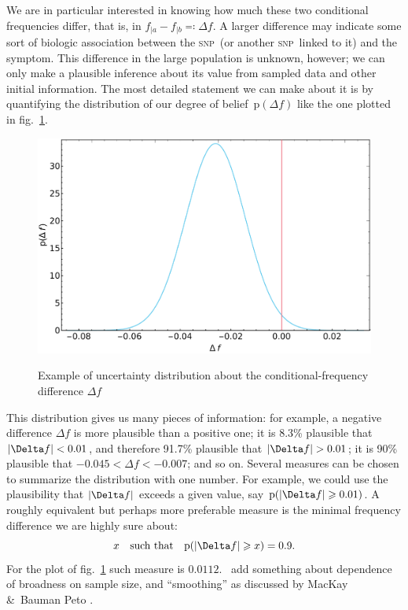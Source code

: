\documentclass[\ifafour a4paper,12pt,\else a5paper,10pt,\fi%
onecolumn,oneside,article,%
british%
]{memoir}
\theoremstyle{remark}
\theoremstyle{innote}
\newcommand*{\citey}{\parencites*}
\newcommand*{\amp}{\&}
\newcommand*{\defs}{\eqqcolon}
\renewcommand{\ge}{\geqslant}%
\DeclarePairedDelimiter\abs{\lvert}{\rvert}
\newcommand*{\pf}{\mathrm{p}}%
\renewcommand*{\|}{\mathpunct{|}}
\newcommand*{\sect}{\S}%
\newcommand*{\fig}{fig.}%
\newcommand*{\puzzle}{\maltese}
\newcommand{\mynote}[1]{ {\color{notecolour}\puzzle\ #1}}
\newcommand*{\dob}{degree of belief}
\newcommand*{\snp}{\textsc{snp}}
\newcommand*{\ya}{a}
\newcommand*{\yb}{b}
\newcommand*{\df}{\Delta f}
\begin{document}
We are in particular interested in knowing how much these two conditional
frequencies differ, that is, in $f_{|\ya}-f_{|\yb} \defs \df$. A larger
difference may indicate some sort of biologic association between the \snp\
(or another \snp\ linked to it) and the symptom. This difference in the
large population is unknown, however; we can only make a plausible
inference about its value from sampled data and other initial information.
The most detailed statement we can make about it is by quantifying the
distribution of our \dob\ $\pf(\df)$ like the one plotted in
\fig~\ref{fig:example_difference_distributions}.
\begin{figure}[t!]%
 \centering\includegraphics[width=0.75\linewidth]{example_diff.pdf}\\
 \caption{Example of uncertainty distribution about the conditional-frequency
   difference $\df$}\label{fig:example_difference_distributions}
\end{figure}%
This distribution gives us many pieces of information: for example, a
negative difference $\df$ is more plausible than a positive one; it is
8.3\% plausible that $\abs{\df}<0.01$, and therefore 91.7\% plausible that
$\abs{\df}>0.01$; it is 90\% plausible that $-0.045 < \df < -0.007$; and so
on. Several measures can be chosen to summarize the distribution with one
number. For example, we could use the plausibility that $\abs{\df}$ exceeds
a given value, say $\pf(\abs{\df}\ge 0.01)$. A roughly equivalent but
perhaps more preferable measure is the minimal frequency difference we are
highly sure about:
\begin{equation}\label{eq:significance_measure}
x\quad\text{such that}\quad \pf(\abs{\df}\ge x)=0.9.
\end{equation}
For the plot of
\fig~\ref{fig:example_difference_distributions} such measure is $0.0112$.
\mynote{add something about dependence of broadness on sample size, and
  \enquote{smoothing} as discussed by MacKay \amp\ Bauman Peto
  \citey[\sect~2.6]{mackayetal1995}.}
\end{document}
